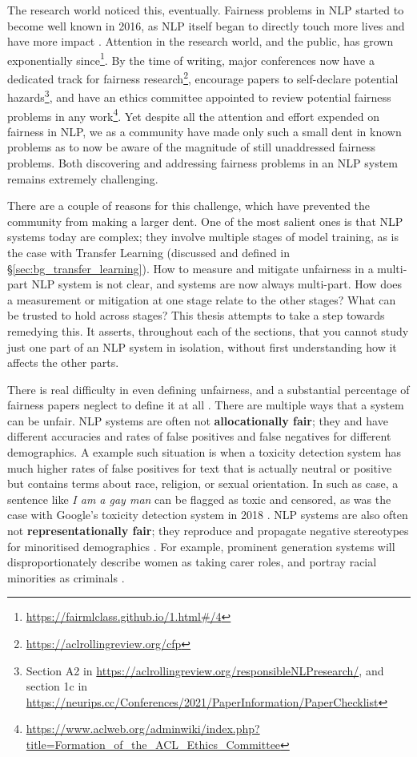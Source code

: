 The research world noticed this, eventually. Fairness problems in NLP started to become well known in 2016, as NLP itself began to directly touch more lives and have more impact \citep{hovy-spruit-2016-social}. Attention in the research world, and the public, has grown exponentially since\footnote{\url{https://fairmlclass.github.io/1.html\#/4}}. By the time of writing, major conferences now have a dedicated track for fairness research\footnote{\url{https://aclrollingreview.org/cfp}}, encourage papers to self-declare potential hazards\footnote{Section A2 in \url{https://aclrollingreview.org/responsibleNLPresearch/}, and section 1c in \url{https://neurips.cc/Conferences/2021/PaperInformation/PaperChecklist}}, and have an ethics committee appointed to review potential fairness problems in any work\footnote{\url{https://www.aclweb.org/adminwiki/index.php?title=Formation_of_the_ACL_Ethics_Committee}}. Yet despite all the attention and effort expended on fairness in NLP, we as a community have made only such a small dent in known problems as to now be aware of the magnitude of still unaddressed fairness problems. Both discovering and addressing fairness problems in an NLP system remains extremely challenging. 

There are a couple of reasons for this challenge, which have prevented the community from making a larger dent. One of the most salient ones is that NLP systems today are complex; they involve multiple stages of model training, as is the case with Transfer Learning (discussed and defined in \S\ref{sec:bg_transfer_learning}). How to measure and mitigate unfairness in a multi-part NLP system is not clear, and systems are now always multi-part. How does a measurement or mitigation at one stage relate to the other stages? What can be trusted to hold across stages? This thesis attempts to take a step towards remedying this. It asserts, throughout each of the sections, that you cannot study just one part of an NLP system in isolation, without first understanding how it affects the other parts. 

There is real difficulty in even defining unfairness, and a substantial percentage of fairness papers neglect to define it at all \citep{blodgett-etal-2020-language, goldfarb-tarrant-etal-2023-prompt}. There are multiple ways that a system can be unfair. NLP systems are often not \textbf{allocationally fair}; they and have different accuracies and rates of false positives and false negatives for different demographics. A example such situation is when a toxicity detection system has much higher rates of false positives for text that is actually neutral or positive but contains terms about race, religion, or sexual orientation. In such as case, a sentence like \textit{I am a gay man} can be flagged as toxic and censored, as was the case with Google's toxicity detection system in 2018 \citep{Dixon2018MeasuringAM}. NLP systems are also often not \textbf{representationally fair}; they reproduce and propagate negative stereotypes for minoritised demographics \citep{crawford_keynote}. For example, prominent generation systems will disproportionately describe women as taking carer roles, and portray racial minorities as criminals \citep{sheng-etal-2019-woman}. 

